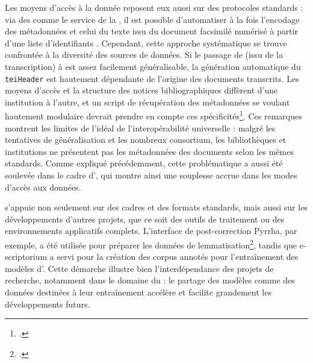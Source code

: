 Les moyens d'accès à la donnée reposent eux aussi sur des protocoles standards : via des \api comme le service \sru de la \bnf, il est possible d'automatiser à la fois l'encodage des métadonnées et celui du texte issu du document facsimilé numérisé à partir d'une 
liste d'identifiants \ark. Cependant, cette approche systématique se trouve confrontée à la diversité des sources de données. Si le passage de \alto (issu de la transcription) à \tei est assez facilement généralisable, la génération automatique du
\texttt{teiHeader} est hautement dépendante de l'origine des documents transcrits. Les
moyens d'accès et la structure des notices bibliographiques diffèrent d'une institution à
l'autre, et un script de récupération des métadonnées se voulant hautement modulaire devrait prendre en compte ces spécificités\footcite[p.117]{kristensen_dalto_2022}. Ces remarques montrent les limites de l'idéal de l'interopérabilité universelle : malgré les tentatives de généralisation
et les nombreux consortium, les bibliothèques et institutions ne
présentent pas les métadonnées des documents selon les mêmes standards. Comme expliqué précédemment, cette problématique a aussi été soulevée dans le cadre d'\eida, qui montre ainsi une souplesse accrue dans les modes d'accès aux données.  

\gaga s'appuie non seulement sur des cadres et des formats standards, mais aussi sur les développements d'autres projets, que ce soit des outils de traitement ou des environnements applicatifs complets. L'interface de post-correction Pyrrha, par exemple, a été utilisée pour préparer les données de lemmatisation\footcite{sagot_gallicorpor_2022}, tandis que e-scriptorium a servi pour la création des corpus annotés pour l'entraînement des modèles d'\htr. Cette
démarche illustre bien l'interdépendance des projets de recherche, notamment dans le domaine du \ml : le partage des modèles comme des données destinées à leur entraînement accélère et facilite grandement les développements futurs.
